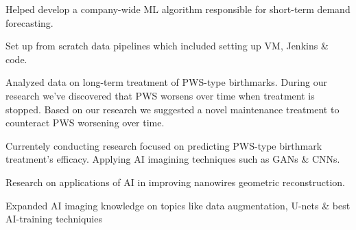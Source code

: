 \documentclass[]{CV}
\begin{document}
\begin{minipage}[t]{0.705\textwidth}
\vspace{\topsep} %
\begin{tightemize}

\item Helped develop a company-wide ML algorithm responsible for short-term demand forecasting.

\item Set up from scratch data pipelines which included setting up VM, Jenkins \& code.

\end{tightemize}


\vspace{\topsep}
\begin{tightemize}

\item Analyzed data on long-term treatment of PWS-type birthmarks. During our research we've discovered that PWS worsens over time when treatment is stopped. Based on our research we suggested a novel maintenance treatment to counteract PWS worsening over time.

\item Currentely conducting research focused on predicting PWS-type birthmark treatment's efficacy. Applying AI imagining techniques such as GANs \& CNNs. 


\end{tightemize}
\sectionsep

\vspace{\topsep} %
\begin{tightemize}
\item Research on applications of AI in improving nanowires geometric reconstruction.

\item Expanded AI imaging knowledge on topics like data augmentation, U-nets \& best AI-training techniquies

\end{tightemize}




\end{minipage}
\end{document}

